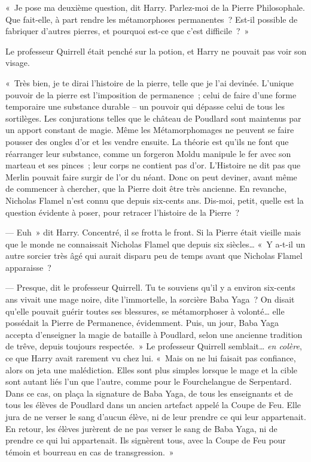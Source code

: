 «~Je pose ma deuxième question, dit Harry.
Parlez-moi de la Pierre Philosophale.
Que fait-elle, à part rendre les métamorphoses permanentes~?
Est-il possible de fabriquer d'autres pierres, et pourquoi est-ce que c'est difficile~?~»

Le professeur Quirrell était penché sur la potion, et Harry ne pouvait pas voir son visage.

«~Très bien, je te dirai l'histoire de la pierre, telle que je l'ai devinée.
L'unique pouvoir de la pierre est l'imposition de permanence~; celui de faire d'une forme temporaire une substance durable -- un pouvoir qui dépasse celui de tous les sortilèges.
Les conjurations telles que le château de Poudlard sont maintenus par un apport constant de magie.
Même les Métamorphomages ne peuvent se faire pousser des ongles d'or et les vendre ensuite.
La théorie est qu'ils ne font que réarranger leur substance, comme un forgeron Moldu manipule le fer avec son marteau et ses pinces~; leur corps ne contient pas d'or.
L'Histoire ne dit pas que Merlin pouvait faire surgir de l'or du néant.
Donc on peut deviner, avant même de commencer à chercher, que la Pierre doit être très ancienne.
En revanche, Nicholas Flamel n'est connu que depuis six-cents ans.
Dis-moi, petit, quelle est la question évidente à poser, pour retracer l'histoire de la Pierre~?

--- Euh~» dit Harry.
Concentré, il se frotta le front.
Si la Pierre était vieille mais que le monde ne connaissait Nicholas Flamel que depuis six siècles…
«~Y a-t-il un autre sorcier très âgé qui aurait disparu peu de temps avant que Nicholas Flamel apparaisse~?

--- Presque, dit le professeur Quirrell.
Tu te souviens qu'il y a environ six-cents ans vivait une mage noire, dite l'immortelle, la sorcière Baba Yaga~?
On disait qu'elle pouvait guérir toutes ses blessures, se métamorphoser à volonté… elle possédait la Pierre de Permanence, évidemment.
Puis, un jour, Baba Yaga accepta d'enseigner la magie de bataille à Poudlard, selon une ancienne tradition de trêve, depuis toujours respectée.~»
Le professeur Quirrell semblait…
\emph{en colère}, ce que Harry avait rarement vu chez lui.
«~Mais on ne lui faisait pas confiance, alors on jeta une malédiction.
Elles sont plus simples lorsque le mage et la cible sont autant liés l'un que l'autre, comme pour le Fourchelangue de Serpentard.
Dans ce cas, on plaça la signature de Baba Yaga, de tous les enseignants et de tous les élèves de Poudlard dans un ancien artefact appelé la Coupe de Feu.
Elle jura de ne verser le sang d'aucun élève, ni de leur prendre ce qui leur appartenait.
En retour, les élèves jurèrent de ne pas verser le sang de Baba Yaga, ni de prendre ce qui lui appartenait.
Ils signèrent tous, avec la Coupe de Feu pour témoin et bourreau en cas de transgression.~»

